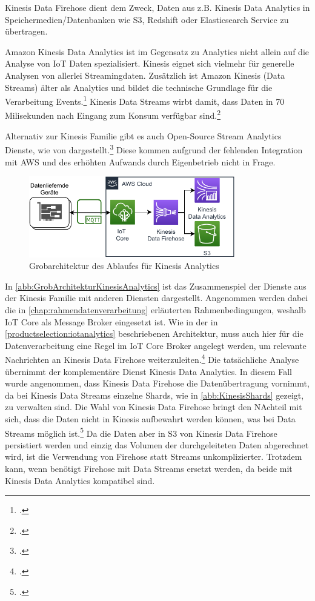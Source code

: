 Kinesis Data Firehose dient dem Zweck, Daten aus z.B. Kinesis Data Analytics in Speichermedien/Datenbanken wie \ac{S3}, Redshift oder Elasticsearch Service zu übertragen.

Amazon Kinesis Data Analytics ist im Gegensatz zu \AWSIOT{} Analytics nicht allein auf die Analyse von \ac{IoT} Daten spezialisiert. Kinesis eignet sich vielmehr für generelle Analysen von allerlei Streamingdaten. Zusätzlich ist Amazon Kinesis (Data Streams) älter als \AWSIOT{} Analytics und bildet die technische Grundlage für die Verarbeitung \AWSIOT{} Events.\footcite[Vgl.][]{Pogosova.28.05.2020} Kinesis Data Streams wirbt damit, dass Daten in 70 Milisekunden nach Eingang zum Konsum verfügbar sind.\footcite[Vgl.][]{AmazonWebServicesInc..o.J.af}

Alternativ zur Kinesis Familie gibt es auch Open-Source Stream Analytics Dienste, wie von \citeauthor{Singh.2016} dargestellt.\footcite[Vgl.][]{Singh.2016} Diese kommen aufgrund der fehlenden Integration mit \ac{AWS} und des erhöhten Aufwands durch Eigenbetrieb nicht in Frage.

\begin{figure}[H]
\centering
\includegraphics[width=0.8\textwidth]{graphics/Kinesis-Analytics-general.pdf}
\caption{Grobarchitektur des Ablaufes für Kinesis Analytics}
\label{abb:GrobArchitekturKinesisAnalytics}
\end{figure}
In \autoref{abb:GrobArchitekturKinesisAnalytics} ist das Zusammenspiel der Dienste aus der Kinesis Familie mit anderen Diensten dargestellt. Angenommen werden dabei die in \autoref{chap:rahmendatenverarbeitung} erläuterten Rahmenbedingungen, weshalb \ac{IoT} Core als Message Broker eingesetzt ist. Wie in der in \autoref{productselection:iotanalytics} beschriebenen Architektur, muss auch hier für die Datenverarbeitung eine Regel im \ac{IoT} Core Broker angelegt werden, um relevante Nachrichten an Kinesis Data Firehose weiterzuleiten.\footcite[Vgl.][]{AmazonWebServicesInc..o.J.} Die tatsächliche Analyse übernimmt der komplementäre Dienst Kinesis Data Analytics. 
In diesem Fall wurde angenommen, dass Kinesis Data Firehose die Datenübertragung vornimmt, da bei Kinesis Data Streams einzelne Shards, wie in \autoref{abb:KinesisShards} gezeigt, zu verwalten sind. Die Wahl von Kinesis Data Firehose bringt den NAchteil mit sich, dass die Daten nicht in Kinesis aufbewahrt werden können, was bei Data Streams möglich ist.\footcite[Vgl.][]{AmazonWebServicesInc..o.J.bh} Da die Daten aber in \ac{S3} von Kinesis Data Firehose persistiert werden und einzig das Volumen der durchgeleiteten Daten abgerechnet wird, ist die Verwendung von Firehose statt Streams unkomplizierter. Trotzdem kann, wenn benötigt Firehose mit Data Streams ersetzt werden, da beide mit Kinesis Data Analytics kompatibel sind.

